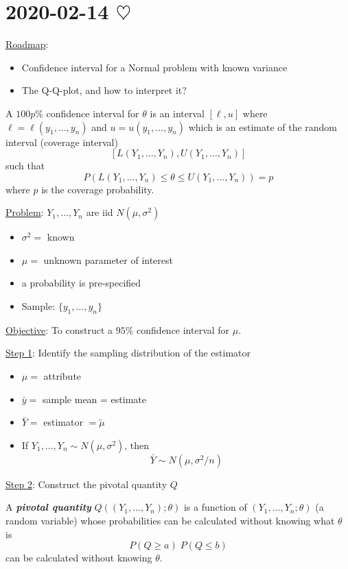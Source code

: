\section{2020-02-14 \texorpdfstring{$\heartsuit$}{[Valentine's Day!]}}

\underline{Roadmap}:
\begin{itemize}
    \item Confidence interval for a Normal problem with known variance
    \item The Q-Q-plot, and how to interpret it?
\end{itemize}

\begin{Definition}{}{}
    A $ 100p\% $ confidence interval for $ \theta $ is an interval $
        [\ell,u] $ where $ \ell=\ell(y_1,\ldots ,y_n) $ and $ u=u(y_1,\ldots
        ,y_n) $ which is an estimate of the random interval (coverage interval)
    \[ \left[ L(Y_1,\ldots ,Y_n),U(Y_1,\ldots ,Y_n) \right] \] such that
    \[ P\left( L(Y_1,\ldots ,Y_n)\leqslant \theta\leqslant U(Y_1,\ldots
        ,Y_n) \right)=p \] where $ p $ is the coverage probability.
\end{Definition}

\underline{Problem}:  $ Y_1,\ldots ,Y_n $ are iid $ N(\mu,\sigma^2) $
\begin{itemize}
    \item $ \sigma^2= $ known
    \item $ \mu= $ unknown parameter of interest
    \item a probability is pre-specified
    \item Sample: $ \{y_1,\ldots ,y_n\} $
\end{itemize}
\underline{Objective}: To construct a $ 95\% $ confidence interval for $ \mu $.

\underline{Step 1}: Identify the sampling distribution of the estimator
\begin{itemize}
    \item $ \mu= $ attribute
    \item $ \bar{y}= $ sample mean = estimate
    \item $ \bar{Y}= $ estimator $ = \tilde{\mu} $
    \item If $ Y_1,\ldots ,Y_n \sim N(\mu,\sigma^2) $, then
          \[ \bar{Y} \sim N\left( \mu,\sigma^2/n \right) \]
\end{itemize}
\underline{Step 2}: Construct the pivotal quantity $ Q $

\begin{Definition}{}{}
    A \textbf{\emph{pivotal quantity}} $ Q((Y_1,\ldots ,Y_n);\theta) $ is a
    function of $ \left( Y_1,\ldots ,Y_n;\theta \right) $ (a random
    variable) whose probabilities can be calculated without knowing what $
        \theta $ is
    \[ P(Q\geqslant a)\; P(Q\leqslant b) \] can be calculated without
    knowing $ \theta $.
\end{Definition}

